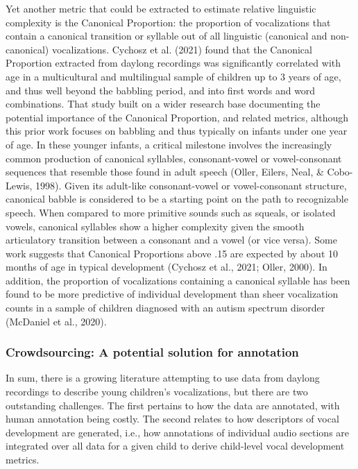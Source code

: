\documentclass[english,,man]{apa6}
\begin{document}
Yet another metric that could be extracted to estimate relative linguistic complexity is the Canonical Proportion: the proportion of vocalizations that contain a canonical transition or syllable out of all linguistic (canonical and non-canonical) vocalizations. Cychosz et al. (2021) found that the Canonical Proportion extracted from daylong recordings was significantly correlated with age in a multicultural and multilingual sample of children up to 3 years of age, and thus well beyond the babbling period, and into first words and word combinations. That study built on a wider research base documenting the potential importance of the Canonical Proportion, and related metrics, although this prior work focuses on babbling and thus typically on infants under one year of age. In these younger infants, a critical milestone involves the increasingly common production of canonical syllables, consonant-vowel or vowel-consonant sequences that resemble those found in adult speech (Oller, Eilers, Neal, \& Cobo-Lewis, 1998). Given its adult-like consonant-vowel or vowel-consonant structure, canonical babble is considered to be a starting point on the path to recognizable speech. When compared to more primitive sounds such as squeals, or isolated vowels, canonical syllables show a higher complexity given the smooth articulatory transition between a consonant and a vowel (or vice versa). Some work suggests that Canonical Proportions above .15 are expected by about 10 months of age in typical development (Cychosz et al., 2021; Oller, 2000). In addition, the proportion of vocalizations containing a canonical syllable has been found to be more predictive of individual development than sheer vocalization counts in a sample of children diagnosed with an autism spectrum disorder (McDaniel et al., 2020).

\hypertarget{crowdsourcing-a-potential-solution-for-annotation}{%
\subsubsection{Crowdsourcing: A potential solution for annotation}\label{crowdsourcing-a-potential-solution-for-annotation}}

In sum, there is a growing literature attempting to use data from daylong recordings to describe young children's vocalizations, but there are two outstanding challenges. The first pertains to how the data are annotated, with human annotation being costly. The second relates to how descriptors of vocal development are generated, i.e., how annotations of individual audio sections are integrated over all data for a given child to derive child-level vocal development metrics.
\end{document}
